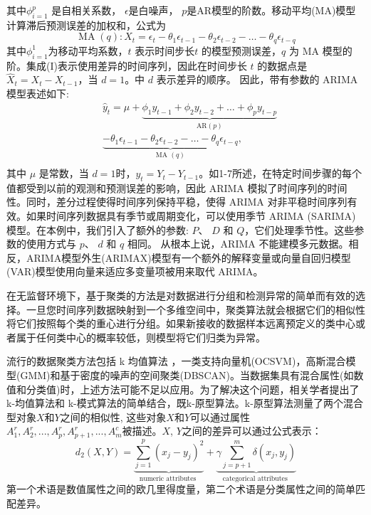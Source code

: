 其中${\phi}^{p}_{i=1}$ 是自相关系数， $\epsilon$是白噪声， $p$是AR模型的阶数。移动平均(MA)模型计算滞后预测误差的加权和，公式为
    \begin{equation}
        \operatorname{MA}(q): X_t=\epsilon_t-\theta_1 \epsilon_{t-1}-\theta_2 \epsilon_{t-2}-\ldots-\theta_q \epsilon_{t-q}    
    \end{equation}
其中${\phi}^{1}_{i=1}$为移动平均系数，$t$ 表示时间步长$t$ 的模型预测误差，$q$ 为 MA 模型的阶。集成(I)表示使用差异的时间序列，因此在时间步长 $t$ 的数据点是$\hat{X}_t=X_t-X_{t-1}$，当 $d = 1$。中 $d$ 表示差异的顺序。
因此，带有参数的 ARIMA 模型表述如下:
\begin{equation}
    \begin{aligned}
    & \hat{y}_t=\mu+\underbrace{\phi_1 y_{t-1}+\phi_2 y_{t-2}+\ldots+\phi_p y_{t-p}}_{\mathrm{AR}(p)} \\
    & \underbrace{-\theta_1 \epsilon_{t-1}-\theta_2 \epsilon_{t-2}-\ldots-\theta_q \epsilon_{t-q}}_{\text {MA }(q)}, \\
    &
    \end{aligned}
    \end{equation}
其中 $\mu$ 是常数，当 $d = 1$时，$y_t = Y_t-Y_{t-1}$。如1-7所述，在特定时间步骤的每个值都受到以前的观测和预测误差的影响，因此 ARIMA 模拟了时间序列的时间性。同时，差分过程使得时间序列保持平稳，使得 ARIMA 对非平稳时间序列有效。如果时间序列数据具有季节或周期变化，可以使用季节 ARIMA (SARIMA)\cite{sarima}模型。在本例中，我们引入了额外的参数: $P$、 $D$ 和 $Q$，它们处理季节性。这些参数的使用方式与 $p$、 $d$ 和 $q$ 相同。
从根本上说，ARIMA 不能建模多元数据。相反，ARIMA模型外生(ARIMAX)\cite{arimax}模型有一个额外的解释变量或向量自回归模型(VAR)\cite{var}模型使用向量来适应多变量项被用来取代 ARIMA。

在无监督环境下，基于聚类的方法是对数据进行分组和检测异常的简单而有效的选择。一旦您时间序列数据映射到一个多维空间中，聚类算法就会根据它们的相似性将它们按照每个类的重心进行分组。如果新接收的数据样本远离预定义的类中心或者属于任何类中心的概率较低，则模型将它们归类为异常。

流行的数据聚类方法包括 k 均值算法\cite{yellow84} ，一类支持向量机(OCSVM)\cite{yellow85}，高斯混合模型(GMM)\cite{yellow88}和基于密度的噪声的空间聚类(DBSCAN)\cite{yellow87}。当数据集具有混合属性(如数值和分类值)时，上述方法可能不足以应用。为了解决这个问题，相关学者提出了 k-均值算法和 k-模式算法的简单结合，既k-原型算法\cite{yellow88}。k-原型算法测量了两个混合型对象$X$和$Y$之间的相似性, 这些对象$X$和$Y$可以通过属性 $A^{r}_{1}, A^{r}_{2}, ... , A^{r}_{p}, A^{r}_{p+1} ,..., A^{c}_{m}$被描述。$X$, $Y$之间的差异可以通过公式表示： 
\begin{equation}
    d_2(X, Y)=\underbrace{\sum_{j=1}^p\left(x_j-y_j\right)^2}_{\text {numeric attributes }}+\underbrace{\gamma \sum_{j=p+1}^m \delta\left(x_j, y_j\right)}_{\text {categorical attributes }}
    \end{equation}
第一个术语是数值属性之间的欧几里得度量，第二个术语是分类属性之间的简单匹配差异。

